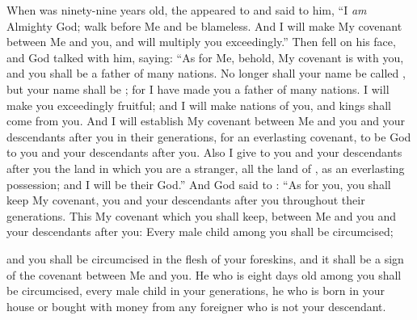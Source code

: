 
\bverse When  was ninety-nine years old, the \lord appeared to  and said to him, ``I \textit{am} Almighty God; walk before Me and be blameless.
\bverse And I will make My covenant between Me and you, and will multiply you exceedingly.''
\bverse Then  fell on his face, and God talked with him, saying: 
\bverse ``As for Me, behold, My covenant is with you, and you shall be a father of many nations.
\bverse No longer shall your name be called , but your name shall be \Abraham; for I have made you a father of many nations.
\bverse I will make you exceedingly fruitful; and I will make nations of you, and kings shall come from you.
\bverse And I will establish My covenant between Me and you and your descendants after you in their generations, for an everlasting covenant, to be God to you and your descendants after you.
\bverse Also I give to you and your descendants after you the  land in which you are a stranger, all the land of \Canaan, as an everlasting possession; and I will be their God.''
\bverse And God said to \Abraham: ``As for you, you shall keep My covenant, you and your descendants after you throughout their generations.
\bverse This \is My covenant which you shall keep, between Me and you and your descendants after you: Every male child among you shall be circumcised;

\bverse and you shall be circumcised in the flesh of your foreskins, and it shall be a sign of the covenant between Me and you.
\bverse He who is eight days old among you shall be circumcised, every male child in your generations, he who is born in your house or bought with money from any foreigner who is not your descendant.

